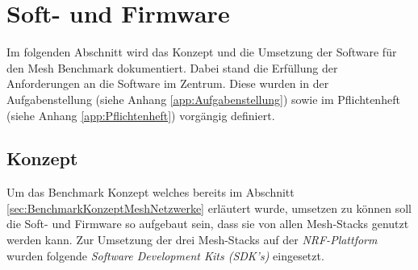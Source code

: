 \clearpage
\section{Soft- und Firmware}\label{sec:Soft-undFirmware}

Im folgenden Abschnitt wird das Konzept und die Umsetzung der Software für den Mesh Benchmark dokumentiert.
Dabei stand die Erfüllung der Anforderungen an die Software im Zentrum. Diese wurden in der Aufgabenstellung (siehe Anhang \ref{app:Aufgabenstellung}) sowie im Pflichtenheft (siehe Anhang \ref{app:Pflichtenheft}) vorgängig definiert. 

%


\subsection{Konzept}\label{subsec:Software_Konzept}

Um das Benchmark Konzept welches bereits im Abschnitt \ref{sec:BenchmarkKonzeptMeshNetzwerke} erläutert wurde, umsetzen zu können soll die Soft- und Firmware so aufgebaut sein, dass sie von allen Mesh-Stacks genutzt werden kann.
Zur Umsetzung der drei Mesh-Stacks auf der \textit{NRF-Plattform} wurden folgende \textit{Software Development Kits (SDK's)} eingesetzt. 

